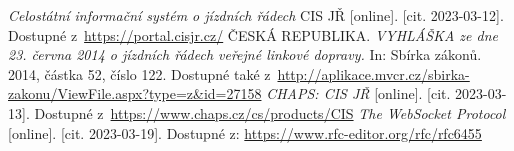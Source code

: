 \begin{thebibliography}{99}
     \textit{Celostátní informační systém o jízdních řádech} CIS JŘ [online]. [cit. 2023-03-12]. Dostupné z~\url{https://portal.cisjr.cz/}
     ČESKÁ REPUBLIKA. \textit{VYHLÁŠKA ze dne 23. června 2014 o jízdních řádech veřejné linkové dopravy.} In: Sbírka zákonů. 2014, částka 52, číslo 122. Dostupné také z~\url{http://aplikace.mvcr.cz/sbirka-zakonu/ViewFile.aspx?type=z&id=27158}
     \textit{CHAPS: CIS JŘ} [online]. [cit. 2023-03-13]. Dostupné z~\url{https://www.chaps.cz/cs/products/CIS}
     \textit{The WebSocket Protocol} [online]. [cit. 2023-03-19]. Dostupné z: \url{https://www.rfc-editor.org/rfc/rfc6455}
\end{thebibliography}